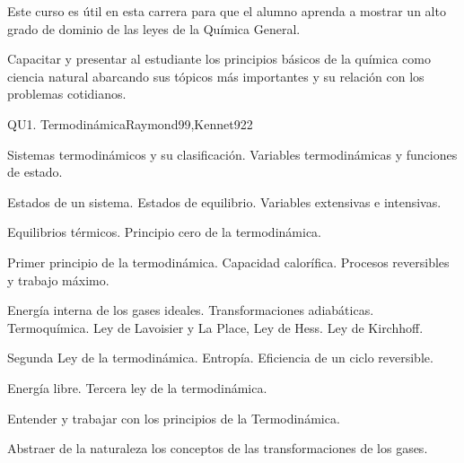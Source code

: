 \begin{syllabus}


\begin{justification}
Este curso es útil en esta carrera para que el alumno aprenda a mostrar un alto grado de dominio de las leyes de la Química General.
\end{justification}

\begin{goals}
\item Capacitar y presentar al estudiante los principios básicos de la química como ciencia natural abarcando sus tópicos más importantes y su relación con los problemas cotidianos.
\end{goals}

\begin{outcomes}
\end{outcomes}

\begin{unit}{QU1. Termodinámica}{Raymond99,Kennet92}{2}
\begin{topics}
      \item Sistemas termodinámicos y su clasificación. Variables termodinámicas y funciones de estado.
      \item Estados de un sistema. Estados de equilibrio. Variables extensivas e intensivas.
      \item Equilibrios térmicos. Principio cero de la termodinámica.
      \item Primer principio de la termodinámica. Capacidad calorífica. Procesos reversibles y trabajo máximo.
      \item Energía interna de los gases ideales. Transformaciones adiabáticas. Termoquímica. Ley de Lavoisier y La Place, Ley de Hess. Ley de Kirchhoff.
      \item Segunda Ley de la termodinámica. Entropía. Eficiencia de un ciclo reversible.
	\item Energía libre. Tercera ley de la termodinámica.
   \end{topics}

   \begin{learningoutcomes}
      \item Entender y trabajar con los principios de la Termodinámica.
      \item Abstraer de la naturaleza los conceptos de las transformaciones de los gases.
   \end{learningoutcomes}
\end{unit}


\end{syllabus}
